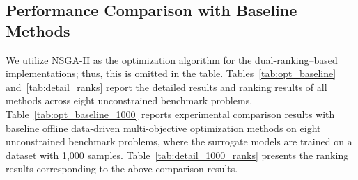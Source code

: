 \documentclass{article}
\begin{document}
\subsection{Performance Comparison with Baseline Methods}
We utilize NSGA-II as the optimization algorithm for the dual-ranking–based implementations; thus, this is omitted in the table. Tables~\ref{tab:opt_baseline} and~\ref{tab:detail_ranks} report the detailed results and ranking results of all methods across eight unconstrained benchmark problems. Table~\ref{tab:opt_baseline_1000} reports experimental comparison results with baseline offline data-driven multi-objective optimization methods on eight unconstrained benchmark problems, where the surrogate models are trained on a dataset with 1,000 samples. Table~\ref{tab:detail_1000_ranks} presents the ranking results corresponding to the above comparison results.
\end{document}

